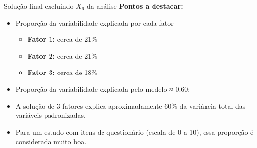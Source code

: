 \documentclass[
  ignorenonframetext,
  aspectratio=169,
]{beamer}
\providecommand{\tightlist}{%
  \setlength{\itemsep}{0pt}\setlength{\parskip}{0pt}}
\begin{document}
\begin{frame}{Solução final excluindo \(X_6\) da análise}
\label{soluuxe7uxe3o-final-excluindo-x_6-da-anuxe1lise-2}
\textbf{Pontos a destacar:}

\begin{itemize}
\item
  Proporção da variabilidade explicada por cada fator

  \begin{itemize}
  \tightlist
  \item
    \textbf{Fator 1:} cerca de 21\%
  \item
    \textbf{Fator 2:} cerca de 21\%
  \item
    \textbf{Fator 3:} cerca de 18\%
  \end{itemize}
\item
  Proporção da variabilidade explicada pelo modelo ≈ 0.60:
\item
  A solução de 3 fatores explica aproximadamente 60\% da variância total
  das variáveis padronizadas.
\item
  Para um estudo com itens de questionário (escala de 0 a 10), essa
  proporção é considerada muito boa.
\end{itemize}
\end{frame}
\end{document}
